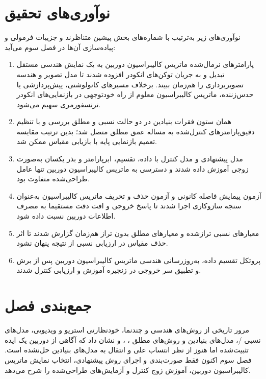 \section{نوآوری‌های تحقیق}
\label{sec:ch2_contributions}
نوآوری‌های زیر به‌ترتیب با شماره‌های بخش پیشین متناظرند و جزییات فرمولی و پیاده‌سازی آن‌ها در فصل سوم می‌آید:

\begin{enumerate}
\item پارامترهای نرمال‌شده ماتریس کالیبراسیون دوربین به یک نمایش هندسی مستقل تبدیل و به جریان توکن‌های انکودر  افزوده شدند تا مدل تصویر و هندسه تصویربرداری را هم‌زمان ببیند. برخلاف مسیرهای کانولوشنی، پیش‌پردازشی یا حدس‌زننده، ماتریس کالیبراسیون معلوم از راه خودتوجهی در بازنمایی‌های انکودر ترنسفورمری سهیم می‌شود.
\item همان ستون فقرات بنیادین در دو حالت نسبی و مطلق بررسی و با تنظیم دقیق‌پارامترهای کنترل‌شده به مساله عمق مطلق متصل شد؛ بدین ترتیب مقایسه تعمیم بازنمایی پایه با بازیابی مقیاس ممکن شد.
\item مدل پیشنهادی و مدل کنترل با داده، تقسیم، ابرپارامتر و بذر یکسان به‌صورت زوجی آموزش داده شدند و دسترسی به ماتریس کالیبراسیون دوربین تنها عامل طراحی‌شده متفاوت بود.
\item آزمون پیمایش فاصله کانونی و آزمون حذف و تحریف ماتریس کالیبراسیون به‌عنوان سنجه سازوکاری اجرا شدند تا پاسخ خروجی و افت دقت مستقیما به مصرف اطلاعات دوربین نسبت داده شود.
\item معیارهای نسبی تراز‌شده و معیارهای مطلق بدون تراز هم‌زمان گزارش شدند تا اثر حذف مقیاس در ارزیابی نسبی از نتیجه پنهان نشود.
\item پروتکل تقسیم داده، به‌روزرسانی هندسی ماتریس کالیبراسیون دوربین پس از برش و تطبیق سر خروجی در زنجیره آموزش و ارزیابی کنترل شدند.
\end{enumerate}

\section{جمع‌بندی فصل}
مرور تاریخی از روش‌های هندسی و چندنما، خودنظارتی استریو و ویدیویی، مدل‌های نسبی /، مدل‌های بنیادین  و روش‌های مطلق ، ،  و  نشان داد که آگاهی از دوربین یک ایده تثبیت‌شده اما هنوز از نظر انتساب علی و انتقال به مدل‌های بنیادین حل‌نشده است. فصل سوم اکنون فقط صورت‌بندی و اجرای روش پیشنهادی، انتخاب نمایش ماتریس کالیبراسیون دوربین، آموزش زوج کنترل و آزمایش‌های طراحی‌شده را شرح می‌دهد.
